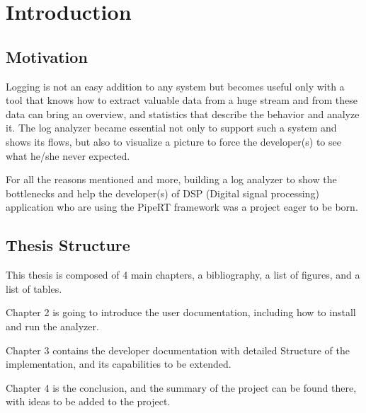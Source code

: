 \chapter{Introduction} %
\label{ch:intro}

\section{Motivation}
Logging is not an easy addition to any system but becomes useful only
with a tool that knows how to extract valuable data from a huge
stream and from these data can bring an overview, and
statistics that describe the behavior and analyze it. The log analyzer
became essential not only to support such a system and shows its flows,
but also to visualize a picture to force the developer(s) to see what
he/she never expected.

For all the reasons mentioned and more, building a log 
analyzer to show the bottlenecks and help the developer(s) of DSP (Digital signal processing)
application who are using the PipeRT framework was a project eager to be born.

\section{Thesis Structure}
This thesis is composed of 4 main chapters, a bibliography, 
a list of figures, and a list of tables.

Chapter 2 is going to introduce the user documentation, including
how to install and run the analyzer.

Chapter 3 contains the developer documentation with detailed Structure
of the implementation, and its capabilities to be extended.

Chapter 4 is the conclusion, and the summary of the project can be
found there, with ideas to be added to the project.